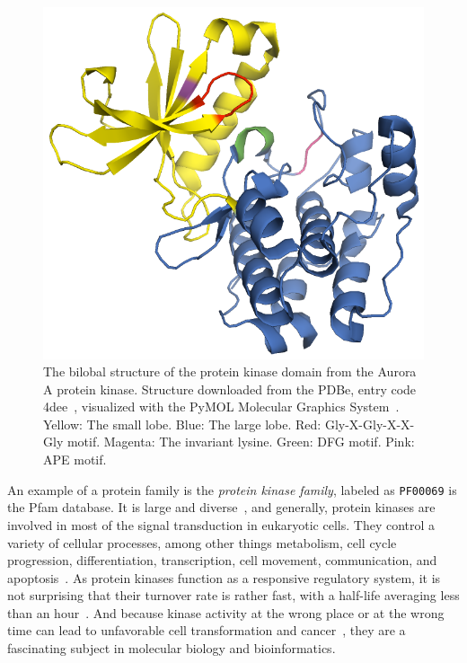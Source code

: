   \begin{figure}
    \centering
    \includegraphics[width=0.8\linewidth]{img/aurora.png}
    \caption{The bilobal structure of the protein kinase domain from the Aurora A protein
    kinase.
    Structure downloaded from the PDBe, entry code 4dee~\cite{lawrence2012development},
    visualized with the PyMOL Molecular Graphics System~\cite{PyMOL}.
    Yellow: The small lobe.
    Blue: The large lobe.
    Red: Gly-X-Gly-X-X-Gly motif.
    Magenta: The invariant lysine.
    Green: DFG motif.
    Pink: APE motif.
    }
    \label{fig:aurora}
  \end{figure}

  An example of a protein family is the \emph{protein kinase family}, labeled as
  \texttt{PF00069} is the Pfam database.
  It is large and diverse~\cite{hanks1988protein, hunter19911}, and generally, protein
  kinases are involved in most of the signal transduction in eukaryotic cells.
  They control a variety of cellular processes, among other things metabolism, cell cycle
  progression, differentiation, transcription, cell movement, communication, and
  apoptosis~\cite{kemp2003amp, matsuoka1998linkage, johnson1994sequential,
  vermeulen2003transcriptional, chen1994cell, warn1998regulation, cross2000serine}.
  As protein kinases function as a responsive regulatory system, it is not surprising that
  their turnover rate is rather fast, with a half-life averaging less than an
  hour~\cite{hunter1982phosphotyrosine}.
  And because kinase activity at the wrong place or at the wrong time can lead to
  unfavorable cell transformation and cancer~\cite{koivunen2006protein,
  caretta2011protein}, they are a fascinating subject in molecular biology and
  bioinformatics.


